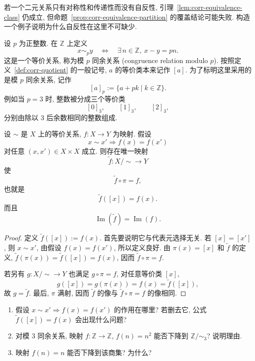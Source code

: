 \documentclass[usesamecnt, thmcnt=section, lang=cn, newtx, 10pt, scheme=chinese]{elegantbook}
\begin{document}
\begin{exercise}\label{ex:corr-equivalence-partition}
若一个二元关系只有对称性和传递性而没有自反性, 引理~\ref{lem:corr-equivalence-class} 仍成立, 但命题~\ref{prop:corr-equivalence-partition} 的覆盖结论可能失败. 构造一个例子说明为什么自反性在这里不可缺少.
\end{exercise}

\begin{instance}
设 $p$ 为正整数. 在 $\mathbb Z$ 上定义
\[
 x\sim_p y
 \quad\Leftrightarrow\quad
 \exists\,n\in\mathbb Z,\ x-y=pn.
\]
这是一个等价关系, 称为{\color{blue}模 $p$ 同余关系 (congruence relation modulo $p$)}. 按照定义~\ref{def:corr-quotient} 的一般记号, $a$ 的等价类本来记作 $[a]$. 为了标明这里采用的是模 $p$ 同余关系, 记作
\[
 [a]_p:=\{a+pk\mid k\in\mathbb Z\}.
\]
例如当 $p=3$ 时, 整数被分成三个等价类
\[
 [0]_3,\qquad [1]_3,\qquad [2]_3,
\]
分别由除以 $3$ 后余数相同的整数组成.
\end{instance}

\begin{proposition}\label{prop:corr-descend-quotient}
设 $\sim$ 是 $X$ 上的等价关系, $f:X\to Y$ 为映射. 假设
\[
 x\sim x'\Rightarrow f(x)=f(x')
\]
对任意 $(x,x')\in X\times X$ 成立. 则存在唯一映射
\[
 \widetilde f:X/{\sim}\longrightarrow Y
\]
使
\[
 \widetilde f\circ\pi=f,
\]
也就是
\[
 \widetilde f([x])=f(x).
\]
而且
\[
 \operatorname{Im}(\widetilde f)=\operatorname{Im}(f).
\]
\end{proposition}

\begin{proof}
定义 $\widetilde f([x]):=f(x)$. 首先要说明它与代表元选择无关. 若 $[x]=[x']$, 则 $x\sim x'$, 由假设 $f(x)=f(x')$, 所以定义良好. 由 $\pi(x)=[x]$ 和 $\widetilde f$ 的定义, $\widetilde f(\pi(x))=\widetilde f([x])=f(x)$, 因而 $\widetilde f\circ\pi=f$.

若另有 $g:X/{\sim}\to Y$ 也满足 $g\circ\pi=f$, 对任意等价类 $[x]$,
\[
 g([x])=g(\pi(x))=f(x)=\widetilde f([x]),
\]
故 $g=\widetilde f$. 最后, $\pi$ 满射, 因而 $\widetilde f$ 的像与 $\widetilde f\circ\pi=f$ 的像相同.
\end{proof}

\begin{exercise}\label{ex:corr-descend-quotient}
\begin{enumerate}[label=\rm(\arabic*)]
  \item 假设 $x\sim x'\Rightarrow f(x)=f(x')$ 的作用在哪里? 若删去它, 公式 $\widetilde f([x])=f(x)$ 会出现什么问题?
  \item 对模 $3$ 同余关系, 映射 $f:\mathbb Z\to\mathbb Z$, $f(n)=n^2$ 能否下降到 $\mathbb Z/{\sim_3}$? 说明理由.
  \item 映射 $f(n)=n$ 能否下降到该商集? 为什么?
\end{enumerate}
\end{exercise}
\end{document}
